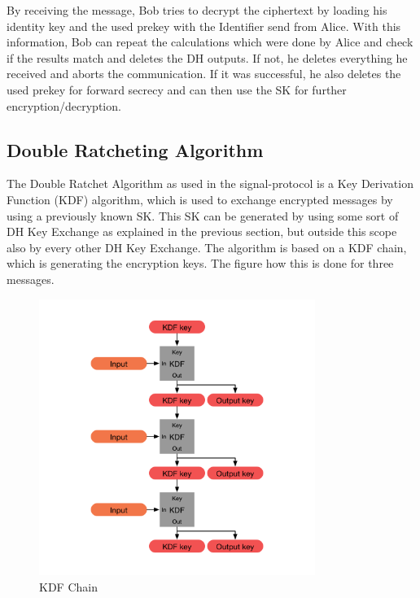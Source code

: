 \documentclass[12pt,oneside,a4paper,parskip]{scrbook}
\begin{document}
By receiving the message, Bob tries to decrypt the ciphertext by loading his identity key and the used prekey with the Identifier send from Alice. With this information, Bob can repeat the calculations which were done by Alice and check if the results match and deletes the DH outputs. If not, he deletes everything he received and aborts the communication. If it was successful, he also deletes the used prekey for forward secrecy and can then use the SK for further encryption/decryption. 
\parencite{marlinspike_x3dh_2016}

\subsection{Double Ratcheting Algorithm}

The Double Ratchet Algorithm as used in the signal-protocol is a Key Derivation Function (KDF) algorithm, which is used to exchange encrypted messages by using a previously known SK. This SK can be generated by using some sort of DH Key Exchange as explained in the previous section, but outside this scope also by every other DH Key Exchange. 
The algorithm is based on a KDF chain, which is generating the encryption keys. The figure how this is done for three messages.

\begin{figure}[ht]
	\centering
  \includegraphics[width=0.8\textwidth]{ressources/kdf_chain.png}
  \caption{KDF Chain \parencite{perrin_double_2016}}
  \label{KDF_Chain}
\end{figure}
\end{document}
